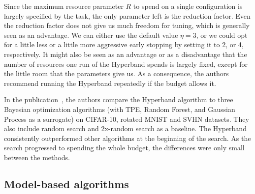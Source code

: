 Since the maximum resource parameter $R$ to spend on a single configuration is largely specified by the task, the only parameter left is the reduction factor. Even the reduction factor does not give us much freedom for tuning, which is generally seen as an advantage. We can either use the default value $\eta=3$, or we could opt for a little less or a little more aggressive early stopping by setting it to 2, or 4, respectively. It might also be seen as an advantage or as a disadvantage that the number of resources one run of the Hyperband spends is largely fixed, except for the little room that the parameters give us. As a consequence, the authors recommend running the Hyperband repeatedly if the budget allows it.

In the publication~\cite{li2018hyperband}, the authors compare the Hyperband algorithm to three Bayesian optimization algorithms (with TPE, Random Forest, and Gaussian Process as a surrogate) on CIFAR-10, rotated MNIST and SVHN datasets. They also include random search and 2x-random search as a baseline. The Hyperband consistently outperformed other algorithms at the beginning of the search. As the search progressed to spending the whole budget, the differences were only small between the methods.

\subsection{Model-based algorithms}
